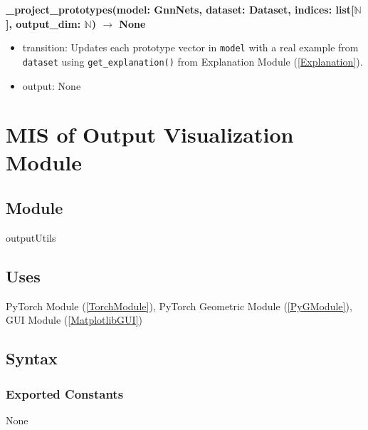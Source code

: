 \documentclass[12pt, titlepage]{article}
\begin{document}
\noindent \textbf{\_project\_prototypes(model: GnnNets, dataset: Dataset, indices: list[\(\mathbb{N}\)], output\_dim: \(\mathbb{N}\)) \(\rightarrow\) None}
\begin{itemize}
  \item transition: Updates each prototype vector in \texttt{model} with a real example from \texttt{dataset} using \texttt{get\_explanation()} from Explanation Module (\ref{Explanation}).
  \item output: None
\end{itemize}





\newpage






\section{MIS of Output Visualization Module} \label{OutputVisualization}

\subsection{Module}
outputUtils

\subsection{Uses}
PyTorch Module (\ref{TorchModule}), PyTorch Geometric Module (\ref{PyGModule}), GUI Module (\ref{MatplotlibGUI})

\subsection{Syntax}

\subsubsection{Exported Constants}
None
\end{document}
